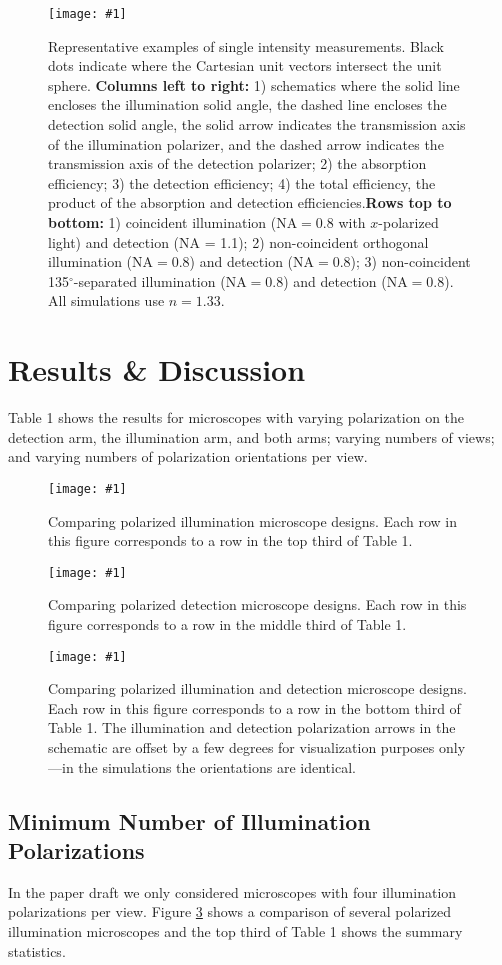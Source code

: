 \documentclass[11pt]{article}
\providecommand{\fig}[4]{
\begin{figure}[h]
 \captionsetup{width=1.0\linewidth}
 \centering
 \texttt{[image: \#1]}
 \caption{#3}
 \label{fig:#4}
\end{figure}
}
\begin{document}
\fig{../figures/single-frame.pdf}{1.0}{Representative examples of single
  intensity measurements. Black dots indicate where the Cartesian unit vectors
  intersect the unit sphere. \newline \newline \textbf{Columns left to right:}
  1) schematics where the solid line encloses the illumination solid angle, the
  dashed line encloses the detection solid angle, the solid arrow indicates the
  transmission axis of the illumination polarizer, and the dashed arrow
  indicates the transmission axis of the detection polarizer; 2) the absorption
  efficiency; 3) the detection efficiency; 4) the total efficiency, the product
  of the absorption and detection efficiencies.\newline \newline \textbf{Rows
    top to bottom:} 1) coincident illumination ($\text{NA} = 0.8$ with
  $x$-polarized light) and detection (NA = 1.1); 2) non-coincident orthogonal
  illumination ($\text{NA} = 0.8$) and detection ($\text{NA} = 0.8$); 3)
  non-coincident 135${}^{\circ}$-separated illumination ($\text{NA} = 0.8$) and
  detection ($\text{NA} = 0.8$). All simulations use $n=1.33$.}{single-frame}

\section{Results \& Discussion}
Table 1 shows the results for microscopes with varying polarization on the
detection arm, the illumination arm, and both arms; varying numbers of views;
and varying numbers of polarization orientations per view.


\fig{../figures/compare-illumination.pdf}{0.6}{Comparing polarized illumination
  microscope designs. Each row in this figure corresponds to a row in the top
  third of Table 1.}{compare-illumination}
\fig{../figures/compare-detection.pdf}{0.6}{Comparing polarized detection
  microscope designs. Each row in this figure corresponds to a row in the middle
  third of Table 1.}{compare-illumination}
\fig{../figures/compare-both.pdf}{0.6}{Comparing polarized illumination and
  detection microscope designs. Each row in this figure corresponds to a row in
  the bottom third of Table 1. The illumination and detection polarization
  arrows in the schematic are offset by a few degrees for visualization purposes
  only---in the simulations the orientations are
  identical.}{compare-both}

\subsection{Minimum Number of Illumination Polarizations}
In the paper draft we only considered microscopes with four illumination
polarizations per view. Figure \ref{fig:compare-illumination} shows a comparison
of several polarized illumination microscopes and the top third of Table 1 shows
the summary statistics.
\end{document}
